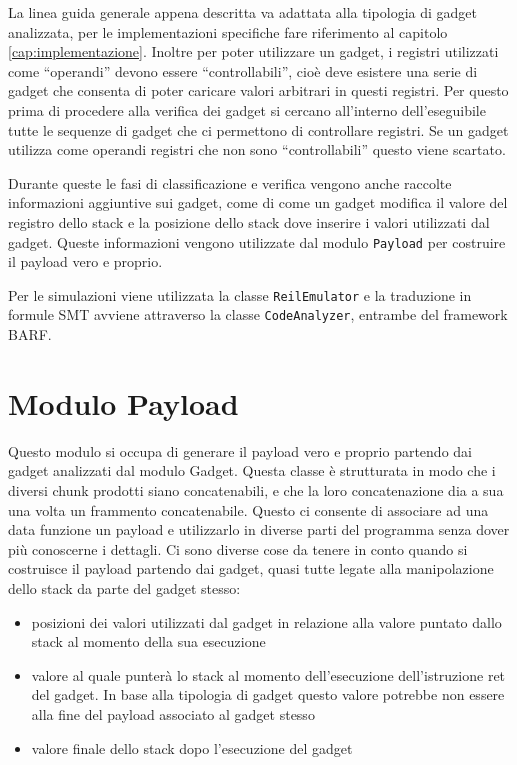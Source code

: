 La linea guida generale appena descritta va adattata alla tipologia di
gadget analizzata, per le implementazioni specifiche fare riferimento
al capitolo \ref{cap:implementazione}. Inoltre per poter utilizzare un
gadget, i registri utilizzati come ``operandi'' devono essere
``controllabili'', cioè deve esistere una serie di gadget che consenta
di poter caricare valori arbitrari in questi registri. Per questo
prima di procedere alla verifica dei gadget si cercano all'interno
dell'eseguibile tutte le sequenze di gadget che ci permettono di
controllare registri. Se un gadget utilizza come operandi registri che
non sono ``controllabili'' questo viene scartato.

Durante queste le fasi di classificazione e verifica vengono anche
raccolte informazioni aggiuntive sui gadget, come di come un gadget
modifica il valore del registro dello stack e la posizione dello stack
dove inserire i valori utilizzati dal gadget. Queste informazioni
vengono utilizzate dal modulo \lstinline{Payload} per costruire il
payload vero e proprio.


Per le simulazioni viene utilizzata la classe \lstinline{ReilEmulator}
e la traduzione in formule SMT avviene attraverso la classe
\lstinline{CodeAnalyzer}, entrambe del framework BARF.


\section{Modulo Payload}

Questo modulo si occupa di generare il payload vero e proprio partendo
dai gadget analizzati dal modulo Gadget. Questa classe è
strutturata in modo che i diversi chunk prodotti siano concatenabili,
e che la loro concatenazione dia a sua una volta un frammento
concatenabile. Questo ci consente di associare ad una data funzione un
payload e utilizzarlo in diverse parti del programma senza dover più
conoscerne i dettagli. Ci sono diverse cose da tenere in conto quando
si costruisce il payload partendo dai gadget, quasi tutte legate alla
manipolazione dello stack da parte del gadget stesso:

\begin{itemize}

  \item posizioni dei valori utilizzati dal gadget in relazione alla
    valore puntato dallo stack al momento della sua esecuzione

  \item valore al quale punterà lo stack al momento dell'esecuzione
    dell'istruzione ret del gadget. In base alla tipologia di gadget
    questo valore potrebbe non essere alla fine del payload associato
    al gadget stesso
    
  \item valore finale dello stack dopo l'esecuzione del gadget

\end{itemize}

